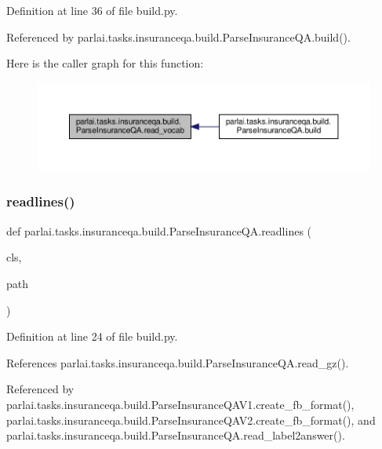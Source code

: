 Definition at line 36 of file build.\+py.



Referenced by parlai.\+tasks.\+insuranceqa.\+build.\+Parse\+Insurance\+Q\+A.\+build().

Here is the caller graph for this function\+:
\nopagebreak
\begin{figure}[H]
\begin{center}
\leavevmode
\includegraphics[width=350pt]{classparlai_1_1tasks_1_1insuranceqa_1_1build_1_1ParseInsuranceQA_ade9a2ccdc949872bb85c31c9440d5e82_icgraph}
\end{center}
\end{figure}
\mbox{\label{classparlai_1_1tasks_1_1insuranceqa_1_1build_1_1ParseInsuranceQA_af8b1135c593e04b80b602d717a3b30d3}} 
\subsubsection{\texorpdfstring{readlines()}{readlines()}}
{\footnotesize\ttfamily def parlai.\+tasks.\+insuranceqa.\+build.\+Parse\+Insurance\+Q\+A.\+readlines (\begin{DoxyParamCaption}\item[{}]{cls,  }\item[{}]{path }\end{DoxyParamCaption})}



Definition at line 24 of file build.\+py.



References parlai.\+tasks.\+insuranceqa.\+build.\+Parse\+Insurance\+Q\+A.\+read\+\_\+gz().



Referenced by parlai.\+tasks.\+insuranceqa.\+build.\+Parse\+Insurance\+Q\+A\+V1.\+create\+\_\+fb\+\_\+format(), parlai.\+tasks.\+insuranceqa.\+build.\+Parse\+Insurance\+Q\+A\+V2.\+create\+\_\+fb\+\_\+format(), and parlai.\+tasks.\+insuranceqa.\+build.\+Parse\+Insurance\+Q\+A.\+read\+\_\+label2answer().

